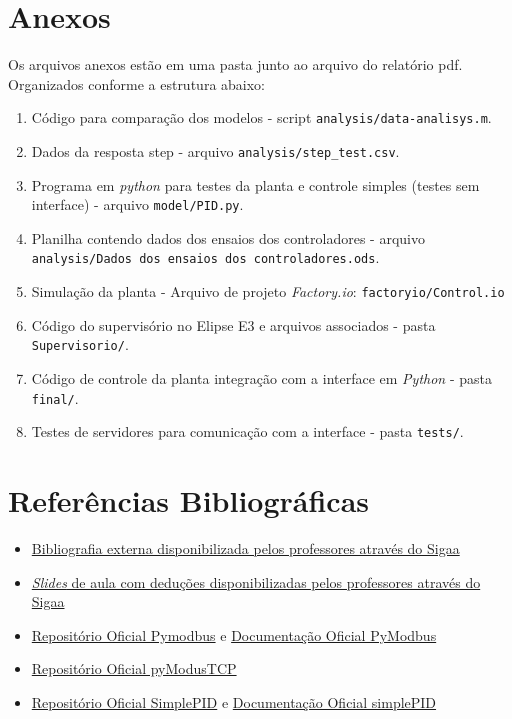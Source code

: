 \documentclass[
	article,			%
	11pt,				%
	oneside,			%
	a4paper,			%
	section=TITLE,		%
	english,			%
	brazil,				%
	sumario=tradicional
	]{abntex2}
\newcommand{\factorio}{\textit{Factory.io}}%
\newcommand{\EE}{Elipse E3}%
\newcommand{\Py}{\textit{Python}}%
\begin{document}
\section*{Anexos}
Os arquivos anexos estão em uma pasta junto ao arquivo do relatório pdf. Organizados conforme a estrutura abaixo:
\begin{enumerate}[label={Anexo \Roman*:}]
    \item Código para comparação dos modelos - script \texttt{analysis/data-analisys.m}.
    \item Dados da resposta step - arquivo \texttt{analysis/step\_test.csv}.
    \item Programa em \textit{python} para testes da planta e controle simples (testes sem interface) - arquivo \texttt{model/PID.py}.
    \item Planilha contendo dados dos ensaios dos controladores - arquivo \texttt{analysis/Dados dos ensaios dos controladores.ods}.
    \item Simulação da planta - Arquivo de projeto \factorio{}: \texttt{factoryio/Control.io}
    \item Código do supervisório no \EE{} e arquivos associados - pasta \texttt{Supervisorio/}.
    \item Código de controle da planta integração com a interface em \Py{} - pasta \texttt{final/}.
    \item Testes de servidores para comunicação com a interface - pasta \texttt{tests/}.
\end{enumerate}

\newpage
\section{Referências Bibliográficas}
\begin{itemize}
\item \href{https://sigaa.ifsc.edu.br/sigaa/portais/discente/discente.jsf#}{Bibliografia externa disponibilizada pelos professores através do Sigaa}
\item \href{https://sigaa.ifsc.edu.br/}{\textit{Slides} de aula com deduções disponibilizadas pelos professores através do Sigaa}
\label{ref:pymodbus}
\item \href{https://github.com/riptideio/pymodbus}{Repositório Oficial Pymodbus} e  \href{https://pymodbus.readthedocs.io/}{Documentação Oficial PyModbus}
\item \href{https://github.com/sourceperl/pyModbusTCP}{Repositório Oficial pyModusTCP}
\item \href{https://github.com/m-lundberg/simple-pid}{Repositório Oficial SimplePID} e \href{https://simple-pid.readthedocs.io/en/latest/}{Documentação Oficial simplePID}

\end{itemize}
\end{document}
